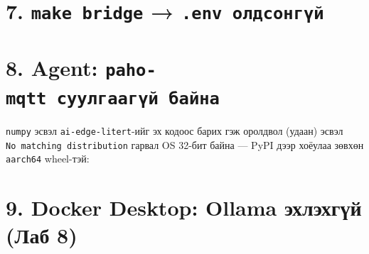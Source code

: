 \hypertarget{make-bridge-.env-ux43eux43bux434ux441ux43eux43dux433ux4afux439}{%
\section{\texorpdfstring{7. \texttt{make\ bridge} → \texttt{.env\ олдсонгүй}}{7. make bridge → .env олдсонгүй}}\label{make-bridge-.env-ux43eux43bux434ux441ux43eux43dux433ux4afux439}}

\begin{Shaded}
\begin{Highlighting}[]
\end{Highlighting}
\end{Shaded}

\hypertarget{agent-paho-mqtt-ux441ux443ux443ux43bux433ux430ux430ux433ux4afux439-ux431ux430ux439ux43dux430}{%
\section{\texorpdfstring{8. Agent: \texttt{paho-mqtt\ суулгаагүй\ байна}}{8. Agent: paho-mqtt суулгаагүй байна}}\label{agent-paho-mqtt-ux441ux443ux443ux43bux433ux430ux430ux433ux4afux439-ux431ux430ux439ux43dux430}}

\begin{Shaded}
\begin{Highlighting}[]
\KeywordTok{\&\&} 
\end{Highlighting}
\end{Shaded}

\texttt{numpy} эсвэл \texttt{ai-edge-litert}-ийг эх кодоос барих гэж оролдвол (удаан) эсвэл \texttt{No\ matching\ distribution} гарвал OS 32-бит байна --- PyPI дээр хоёулаа зөвхөн \texttt{aarch64} wheel-тэй:

\begin{Shaded}
\begin{Highlighting}[]
\end{Highlighting}
\end{Shaded}

\hypertarget{docker-desktop-ollama-ux44dux445ux43bux44dux445ux433ux4afux439-ux43bux430ux431-8}{%
\section{9. Docker Desktop: Ollama эхлэхгүй (Лаб 8)}\label{docker-desktop-ollama-ux44dux445ux43bux44dux445ux433ux4afux439-ux43bux430ux431-8}}

